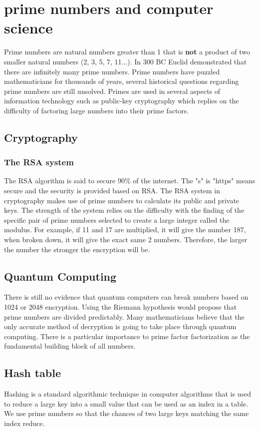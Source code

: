 \documentclass[12pt]{amsart} %
\theoremstyle{definition}
\theoremstyle{remark}
\numberwithin{equation}{section}
\begin{document}
\section{prime numbers and computer science}

Prime numbers are natural numbers greater than 1 that is \textbf{not} a product of two smaller natural numbers (2, 3, 5, 7, 11...). In 300 BC Euclid demonstrated that there are infinitely many prime numbers. Prime numbers have puzzled mathematicians for thousands of years, several historical questions regarding prime numbers are still unsolved. Primes are used in several aspects of information technology such as public-key cryptography which replies on the difficulty of factoring large numbers into their prime factors.
\subsection{Cryptography} 	
\subsubsection{The RSA system}
The RSA algorithm is said to secure 90\% of the internet. The "s" is "https" means secure and the security is provided based on RSA. The RSA system in cryptography makes use of prime numbers to calculate its public and private keys. The strength of the system relies on the difficulty with the finding of the specific pair of prime numbers selected to create a large integer called the modulus. For example, 
if 11 and 17 are multiplied, it will give the number 187, when broken down, it will give the exact same 2 numbers. Therefore, the larger the number the stronger the encryption will be.
\subsection{Quantum Computing}
There is still no evidence that quantum computers can break numbers based on 1024 or 2048 encryption. Using the Riemann hypothesis would propose that prime numbers are divided predictably. Many mathematicians believe that the only accurate method of decryption is going to take place through quantum computing. There is a particular importance to prime factor factorization as the fundamental building block of all numbers. 
\subsection{Hash table}
Hashing is a standard algorithmic technique in computer algorithms that is used to reduce a large key into a small value that can be used as an index in a table. We use prime numbers so that the chances of two large keys matching the same index reduce. 
\end{document}
